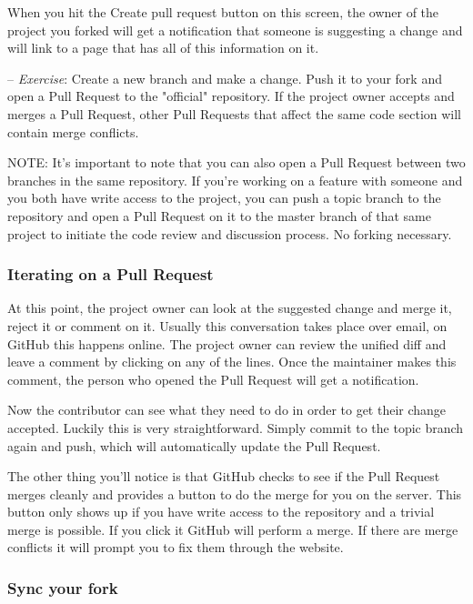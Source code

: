 \documentclass[12pt,a4]{article}
\begin{document}
When you hit the Create pull request button on this screen, the owner of the
project you forked will get a notification that someone is suggesting a change
and will link to a page that has all of this information on it.

{\sf -- \emph{Exercise}:} Create a new branch and make a change. Push it to your
fork and open a Pull Request to the "official" repository. If the project owner
accepts and merges a Pull Request, other Pull Requests that affect the same code
section will contain merge conflicts.

{\sf NOTE:} It’s important to note that you can also open a Pull Request between
two branches in the same repository. If you’re working on a feature with someone
and you both have write access to the project, you can push a topic branch to
the repository and open a Pull Request on it to the master branch of that same
project to initiate the code review and discussion process. No forking
necessary.

\subsubsection{Iterating on a Pull Request}
At this point, the project owner can look at the suggested change and merge it,
reject it or comment on it. Usually this conversation takes place over email, on
GitHub this happens online.  The project owner can review the unified diff and
leave a comment by clicking on any of the lines. Once the maintainer makes this
comment, the person who opened the Pull Request will get a notification. 

Now the contributor can see what they need to do in order to get their change
accepted. Luckily this is very straightforward. Simply commit to the topic
branch again and push, which will automatically update the Pull Request.

The other thing you’ll notice is that GitHub checks to see if the Pull Request
merges cleanly and provides a button to do the merge for you on the server. This
button only shows up if you have write access to the repository and a trivial
merge is possible. If you click it GitHub will perform a merge. If there are
merge conflicts it will prompt you to fix them through the website.

\subsubsection{Sync your fork}

\begin{center}
\end{center}
\end{document}
